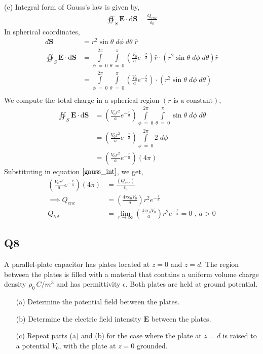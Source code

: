 \documentclass[12pt]{article}
\providecommand{\brak}[1]{\ensuremath{\left(#1\right)}}
\begin{document}
(c) Integral form of Gauss's law is given by,
\begin{align}
    \oiint_S \mathbf{E} \cdot \mathrm{d}\mathbf{S} = \frac{Q_{enc}}{\varepsilon_0} \label{gauss_int}
\end{align}
In spherical coordinates,
\begin{align*}
    d\mathbf{S} &= r^2 \sin{\theta} \;d\phi \;d\theta \;\hat{r}\\
    \oiint_S \mathbf{E} \cdot \mathrm{d}\mathbf{S} &= \int\limits_{\phi \;=\; 0}^{2\pi} \int\limits_{\theta \;=\; 0}^{\pi} \brak{\frac{V_0}{a} e^{-\frac{r}{a}}} \hat{r} \cdot \brak{r^2 \sin{\theta} \;d\phi \;d\theta} \hat{r}\\
    &= \int\limits_{\phi \;=\; 0}^{2\pi} \int\limits_{\theta \;=\; 0}^{\pi} \brak{\frac{V_0}{a} e^{-\frac{r}{a}}} \cdot \brak{r^2 \sin{\theta} \;d\phi \;d\theta} \\
\end{align*}
We compute the total charge in a spherical region \brak{r \text{ is a constant}},
\begin{align*}
    \oiint_S \mathbf{E} \cdot \mathrm{d}\mathbf{S} &= \brak{\frac{V_0 r^2}{a} e^{-\frac{r}{a}}} \int\limits_{\phi \;=\; 0}^{2\pi} \int\limits_{\theta \;=\; 0}^{\pi}  \sin{\theta} \;d\phi \;d\theta \\
    &= \brak{\frac{V_0 r^2}{a} e^{-\frac{r}{a}}} \int\limits_{\phi \;=\; 0}^{2\pi} 2\;d\phi \\
    &= \brak{\frac{V_0 r^2}{a} e^{-\frac{r}{a}}} \brak{4\pi}
\end{align*}
Substituting in equation $\ref{gauss_int}$, we get,
\begin{align*}
    \brak{\frac{V_0 r^2}{a} e^{-\frac{r}{a}}} \brak{4\pi} &= \frac{\brak{Q_{enc}}}{\epsilon_0}\\
    \implies Q_{enc} &= \brak{\frac{4\pi\epsilon_0 V_0}{a}} r^2 e^{-\frac{r}{a}}\\
    Q_{tot} &= \lim\limits_{r \to \infty} \brak{\frac{4\pi\epsilon_0 V_0}{a}} r^2 e^{-\frac{r}{a}} = 0 \text{ , } a > 0
\end{align*}

\subsection*{Q8}
A parallel-plate capacitor has plates located at $z = 0$ and $z = d$. The region between the plates is filled with a material that contains a uniform volume charge density $\rho_0 \, C/m^3$ and has permittivity $\epsilon$. Both plates are held at ground potential.
\begin{enumerate}
    \item[(a)] Determine the potential field between the plates.
    \item[(b)] Determine the electric field intensity $\mathbf{E}$ between the plates.
    \item[(c)] Repeat parts (a) and (b) for the case where the plate at $z = d$ is raised to a potential $V_0$, with the plate at $z = 0$ grounded.
\end{enumerate}
\end{document}
